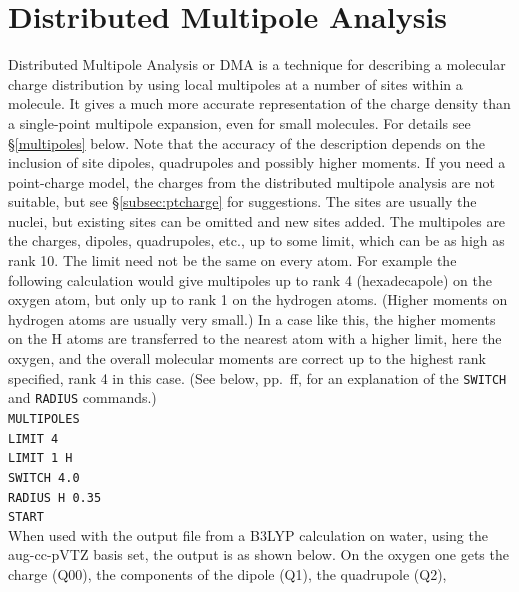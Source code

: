 \documentclass[12pt,txfonts]{paper}
\begin{document}
\section {Distributed Multipole Analysis}

Distributed Multipole Analysis or DMA is a technique for describing a
molecular charge distribution by using
local multipoles at a number of sites within a molecule. It gives a
much more accurate representation of the charge density than a
single-point multipole expansion, even for small molecules. For
details see \S\ref{multipoles} below. Note that the accuracy of the
description depends on the inclusion of site dipoles, quadrupoles and
possibly higher moments. If you need a point-charge model, the charges
from the distributed multipole analysis are not suitable, but see
\S\ref{subsec:ptcharge} for suggestions. The sites
are usually the nuclei, but existing sites can be omitted and
new sites added. The multipoles are the charges,
dipoles, quadrupoles, etc., up to some limit, which can be as high as
rank 10. The limit need not be the same on every atom. For example the
following 
calculation would give multipoles up to rank 4 (hexadecapole) on the
oxygen atom, but only up to rank 1 on the hydrogen atoms. (Higher
moments on hydrogen atoms are usually very small.) In a case like
this, the higher moments on the H atoms are
transferred to the nearest atom with a higher limit, here the oxygen,
and the overall molecular moments are correct up to the highest rank
specified, rank 4 in this case. (See below, pp.~\pageref{p:switch}ff, for
an explanation of the \verb+SWITCH+ and \verb+RADIUS+ commands.)\\
\hspace*{2 em}\verb/MULTIPOLES/\\
\hspace*{2 em}\verb/LIMIT 4/\\
\hspace*{2 em}\verb/LIMIT 1 H/\\
\hspace*{2 em}\verb/SWITCH 4.0/\\
\hspace*{2 em}\verb/RADIUS H 0.35/\\
\hspace*{2 em}\verb/START/\\
When used with the output file from a B3LYP calculation on water,
using the aug-cc-pVTZ basis set, the
output is as shown %
below.  On the oxygen one gets the
charge (Q00), the components of the dipole (Q1), the quadrupole (Q2),
\end{document}
